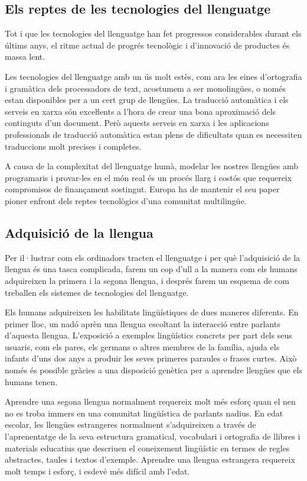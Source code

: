 \documentclass[]{../../metanetpaper}
\begin{document}
\begin{multicols}{2}
\subsection{Els reptes de les tecnologies del llenguatge}

Tot i que les tecnologies del llenguatge han fet progressos considerables durant els últims anys, el ritme actual de progrés tecnològic i d’innovació de productes és massa lent.

Les tecnologies del llenguatge amb un ús molt estès, com ara les eines d’ortografia i gramàtica dels processadors de text, acostumem a ser monolingües, o només estan disponibles per a un cert grup de llengües. La traducció automàtica i els serveis en xarxa són exceŀlents a l’hora de crear una bona aproximació dels continguts d’un document. Però aquests serveis en xarxa i les aplicacions professionals de traducció automàtica estan plens de dificultats quan es necessiten traduccions molt precises i completes. 

A causa de la complexitat del llenguatge humà, modelar les nostres llengües amb programaris i provar-les en el món real és un procés llarg i costós que requereix compromisos de finançament sostingut. Europa ha de mantenir el seu paper pioner enfront dels reptes tecnològics d'una comunitat multilingüe.

\subsection{Adquisició de la llengua}

Per il·lustrar com els ordinadors tracten el llenguatge i per què l’adquisició de la llengua és una tasca complicada, farem un cop d’ull a la manera com els humans adquireixen la primera i la segona llengua, i després farem un esquema de com treballen els sistemes de tecnologies del llenguatge.

Els humans adquireixen les habilitats lingüístiques de dues maneres diferents. En primer lloc, un nadó aprèn una llengua escoltant la interacció entre parlants d’aquesta llengua. L’exposició a exemples lingüístics concrets per part dels seus usuaris, com els pares, els germans o altres membres de la família, ajuda els infants d’uns dos anys a produir les seves primeres paraules o frases curtes. Això només és possible gràcies a una disposició genètica per a aprendre llengües que els humans tenen.

Aprendre una segona llengua normalment requereix molt més esforç quan el nen no es troba immers en una comunitat lingüística de parlants nadius. En edat escolar, les llengües estrangeres normalment s’adquireixen a través de l’aprenentatge de la seva estructura gramatical, vocabulari i ortografia de llibres i materials educatius que descriuen el coneixement lingüístic en termes de regles abstractes, taules i textos d’exemple. Aprendre una llengua estrangera requereix molt temps i esforç, i esdevé més difícil amb l’edat.


\end{multicols}
\end{document}
